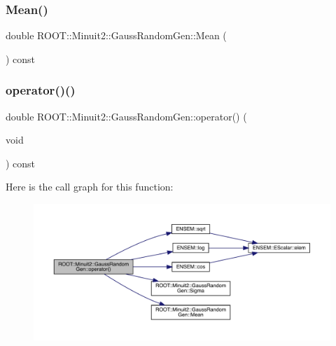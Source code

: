\subsubsection{\texorpdfstring{Mean()}{Mean()}\hspace{0.1cm}{\footnotesize\ttfamily [2/2]}}
{\footnotesize\ttfamily double R\+O\+O\+T\+::\+Minuit2\+::\+Gauss\+Random\+Gen\+::\+Mean (\begin{DoxyParamCaption}{ }\end{DoxyParamCaption}) const\hspace{0.3cm}{\ttfamily [inline]}}

\mbox{\label{classROOT_1_1Minuit2_1_1GaussRandomGen_aaefcd8e04b3388314c9f14932a17a163}} 
\subsubsection{\texorpdfstring{operator()()}{operator()()}\hspace{0.1cm}{\footnotesize\ttfamily [1/2]}}
{\footnotesize\ttfamily double R\+O\+O\+T\+::\+Minuit2\+::\+Gauss\+Random\+Gen\+::operator() (\begin{DoxyParamCaption}\item[{void}]{ }\end{DoxyParamCaption}) const\hspace{0.3cm}{\ttfamily [inline]}}

Here is the call graph for this function\+:
\nopagebreak
\begin{figure}[H]
\begin{center}
\leavevmode
\includegraphics[width=350pt]{d8/dd8/classROOT_1_1Minuit2_1_1GaussRandomGen_aaefcd8e04b3388314c9f14932a17a163_cgraph}
\end{center}
\end{figure}
\mbox{\label{classROOT_1_1Minuit2_1_1GaussRandomGen_aaefcd8e04b3388314c9f14932a17a163}} 
